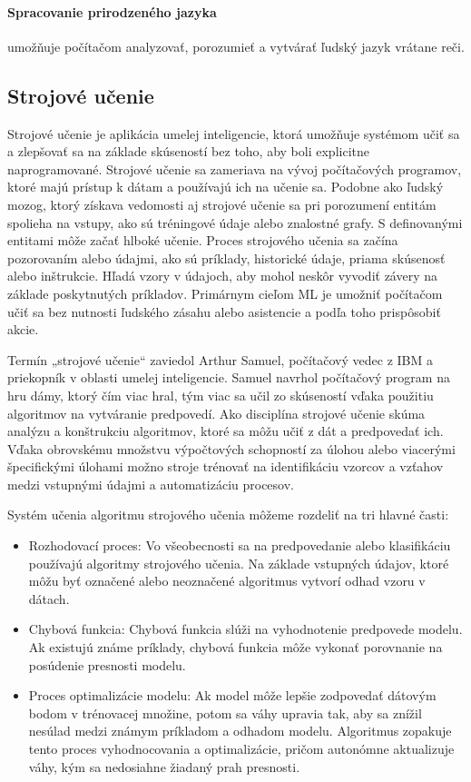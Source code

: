 \paragraph{Spracovanie prirodzeného jazyka} umožňuje počítačom analyzovať, porozumieť a vytvárať ľudský jazyk vrátane reči.

\subsection{Strojové učenie}
Strojové učenie je aplikácia umelej inteligencie, ktorá umožňuje systémom učiť sa a zlepšovať sa na základe skúseností bez toho, aby boli explicitne naprogramované. Strojové učenie sa zameriava na vývoj počítačových programov, ktoré majú prístup k dátam a používajú ich na učenie sa. Podobne ako ľudský mozog, ktorý získava vedomosti aj strojové učenie sa pri porozumení entitám spolieha na vstupy, ako sú tréningové údaje alebo znalostné grafy. S definovanými entitami môže začať hlboké učenie.
Proces strojového učenia sa začína pozorovaním alebo údajmi, ako sú príklady, historické údaje, priama skúsenosť alebo inštrukcie. Hľadá vzory v údajoch, aby mohol neskôr vyvodiť závery na základe poskytnutých príkladov. Primárnym cieľom ML je umožniť počítačom učiť sa bez nutnosti ľudského zásahu alebo asistencie a podľa toho prispôsobiť akcie.

Termín „strojové učenie“ zaviedol Arthur Samuel, počítačový vedec z IBM a priekopník v oblasti umelej inteligencie. Samuel navrhol počítačový program na hru dámy, ktorý čím viac hral, tým viac sa učil zo skúseností vďaka použitiu algoritmov na vytváranie predpovedí. Ako disciplína strojové učenie skúma analýzu a konštrukciu algoritmov, ktoré sa môžu učiť z dát a predpovedať ich. Vďaka obrovskému množstvu výpočtových schopností za úlohou alebo viacerými špecifickými úlohami možno stroje trénovať na identifikáciu vzorcov a vzťahov medzi vstupnými údajmi a automatizáciu procesov.

Systém učenia algoritmu strojového učenia môžeme rozdeliť na tri hlavné časti:
\begin{itemize}
    \item Rozhodovací proces: Vo všeobecnosti sa na predpovedanie alebo klasifikáciu používajú algoritmy strojového učenia. Na základe vstupných údajov, ktoré môžu byť označené alebo neoznačené algoritmus vytvorí odhad vzoru v dátach.
    \item Chybová funkcia: Chybová funkcia slúži na vyhodnotenie predpovede modelu. Ak existujú známe príklady, chybová funkcia môže vykonať porovnanie na posúdenie presnosti modelu.
    \item Proces optimalizácie modelu: Ak model môže lepšie zodpovedať dátovým bodom v trénovacej množine, potom sa váhy upravia tak, aby sa znížil nesúlad medzi známym príkladom a odhadom modelu. Algoritmus zopakuje tento proces vyhodnocovania a optimalizácie, pričom autonómne aktualizuje váhy, kým sa nedosiahne žiadaný prah presnosti.
\end{itemize}

